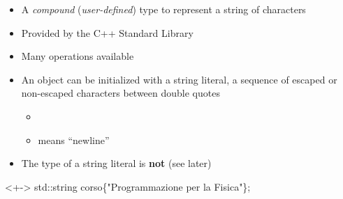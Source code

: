 \begin{frame}[fragile]{}

  \begin{itemize}[<+->]

  \item A \textit{compound} (\textit{user-defined}) type to represent a
    string of characters
  \item Provided by the C++ Standard Library
  \item Many operations available
  \item An  object can be initialized with a string literal, a
    sequence of escaped or non-escaped characters between double quotes
    \begin{itemize}[<.->]
    \item {}
    \item {} means ``newline''
    \end{itemize}
  \item The type of a string literal is \textbf{not}  (see
    later)
  \end{itemize}

  \begin{codeblock}<+->{
std::string corso\{"Programmazione per la Fisica"\};
}\end{codeblock}


\end{frame}

